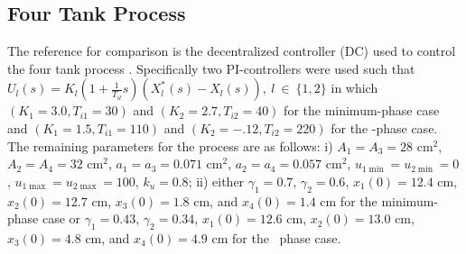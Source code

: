 \subsection{Four Tank Process}
The reference for comparison is the decentralized controller (DC) used
to control the four tank process \cite{johansson00:_quadr_tank_proces}.  Specifically two
PI-controllers were used such that $U_l(s) = K_l \left ( 1 + \frac{1}{T_{il}}
  s \right )(X_l^*(s)-X_l(s)),\ l\ \in\ \{1,2\}$ in which
$(K_1=3.0,T_{i1}=30)$ and $(K_2=2.7,T_{i2}=40)$ for the minimum-phase
case and $(K_1=1.5,T_{i1}=110)$
and $(K_2=-.12,T_{i2}=220)$ for the \nonminimum-phase case.  The remaining parameters for the
process are as follows: i) $A_1 = A_3 = 28$ cm$^2$,  $A_2 = A_4 = 32$
cm$^2$, $a_1 = a_3 = 0.071$ cm$^2$, $a_2 = a_4 = 0.057$ cm$^2$,
$u_{1\min} = u_{2\min} = 0$, $u_{1\max} = u_{2\max} = 100$, $k_u =
0.8$; ii) either $\gamma_1 = 0.7$, $\gamma_2 = 0.6$, $x_1(0) = 12.4$ cm,
$x_2(0) = 12.7$ cm, $x_3(0) = 1.8$ cm, and $x_4(0) = 1.4$ cm for the
minimum-phase case or $\gamma_1 = 0.43$, $\gamma_2 = 0.34$, $x_1(0) =
12.6$ cm, $x_2(0) = 13.0$ cm, $x_3(0) = 4.8$ cm, and $x_4(0) = 4.9$ cm
for the \nonminimum\ phase case.

